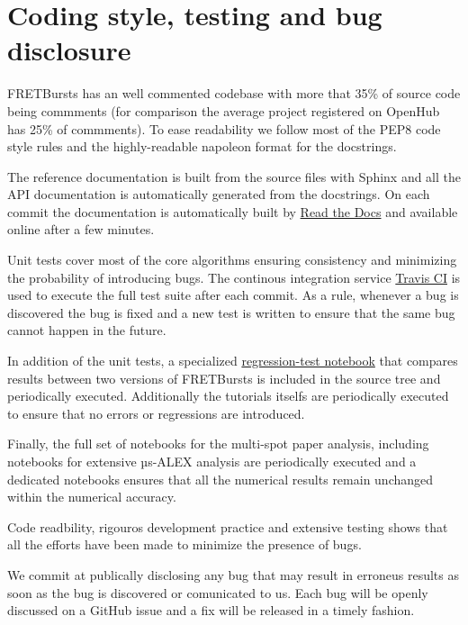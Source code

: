 \section{Coding style, testing and bug disclosure}

FRETBursts has an well commented codebase with more that 35\% of source code
being commments (for comparison the average project registered on OpenHub has 25\%
of commments). To ease readability we follow most of the PEP8 code style rules and the highly-readable napoleon format for the docstrings.

The reference documentation is built from the source files with Sphinx and
all the API documentation is automatically generated from the docstrings.
On each commit the documentation is automatically built by 
\href{https://readthedocs.org/}{Read the Docs}
and available online after a few minutes.

Unit tests cover most of the core algorithms ensuring consistency and 
minimizing the probability of introducing bugs. The continous integration
service \href{http://travis-ci.org}{Travis CI} is used to execute the full
test suite after each commit.
As a rule, whenever a bug is discovered the bug is fixed and a new test is 
written to ensure that the same bug cannot happen in the future.

In addition of the unit tests, a specialized 
\href{https://github.com/tritemio/FRETBursts/blob/master/notebooks/dev/tests/FRETBursts\%20-\%20Regression\%20tests.ipynb}{regression-test notebook}
that compares results between two versions of FRETBursts is
included in the source tree and periodically executed. Additionally
the tutorials itselfs are periodically executed to ensure that
no errors or regressions are introduced.

Finally, the full set of notebooks for the multi-spot paper analysis,
including notebooks for extensive µs-ALEX analysis are periodically
executed and a dedicated notebooks ensures that all the numerical
results remain unchanged within the numerical accuracy.

Code readbility, rigouros development practice and extensive testing
shows that all the efforts have been made to minimize the presence 
of bugs.

We commit at publically disclosing any bug that may result in erroneus results 
as soon as the bug is discovered or comunicated to us.
Each bug will be openly discussed on a GitHub issue and a fix will be released 
in a timely fashion.
